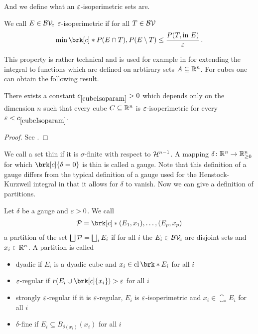 \newpage
\noindent And we define what an $\e$-isoperimetric sets are.

\begin{definition}[$\e$-isoperimetric]
We call $E\in\mathcal{BV\!}_c$ $\e$-isoperimetric if for all $T\in\mathcal{BV\!}$
\begin{align*}
	\min\brk[c]*{P(E\cap T),P(E\setminus T)}\leq \frac{P(T,\text{in }E)}{\e}\,.
\end{align*}
\end{definition}

\noindent This property is rather technical and is used for example in \cite[Definition 3.11]{Pfe2016} for extending the integral to functions which are defined on arbtirary sets $A\subseteq \mathbb{R}^n$.
For cubes one can obtain the following result.

\begin{proposition}
There exists a constant $\useconstant{cubeIsoparam}>0$ which depends only on the dimension $n$ such that every cube $C\subseteq\mathbb{R}^n$ is $\e$-isoperimetric for every $\e<\useconstant{cubeIsoparam}$.
\end{proposition}
\begin{proof}
See \cite[Lemma 3.1]{Pfe2016}.
\end{proof}

We call a set thin if it is $\sigma$-finite with respect to $\mathcal{H}^{n-1}$. A mapping $\delta\colon\mathbb{R}^n\to\mathbb{R}^n_{\geq 0}$ for which $\brk[c]{\delta=0}$ is thin is called a gauge. Note that this definition of a gauge differs from the typical definition of a gauge used for the Henstock-Kurzweil integral in that it allows for $\delta$ to vanish.
Now we can give a definition of partitions.

\begin{definition}[Partitions]
Let $\delta$ be a gauge and $\varepsilon>0$.
We call
\begin{align*}
	\cP=\brk[c]*{(E_1,x_1),\dots, (E_p,x_p)}
\end{align*}
a partition of the set $\bigsqcup\mathcal{P}=\bigsqcup_iE_i$ if for all $i$ the $E_i\in\mathcal{BV\!}_c$ are disjoint sets and $x_i\in\mathbb{R}^n$. A partition is called
\begin{itemize}
	\item dyadic if $E_i$ is a dyadic cube and $x_i\in \closure\brk*{E_i}$ for all $i$
	\item $\e$-regular if $r(E_i\cup\brk[c]{x_i})>\e$ for all $i$
	\item strongly $\e$-regular if it is $\e$-regular, $E_i$ is $\e$-isoperimetric and $x_i\in\closure_*E_i$ for all $i$
	\item $\delta$-fine if $E_i\subseteq B_{\delta(x_i)}(x_i)$ for all $i$
\end{itemize}
\end{definition}


